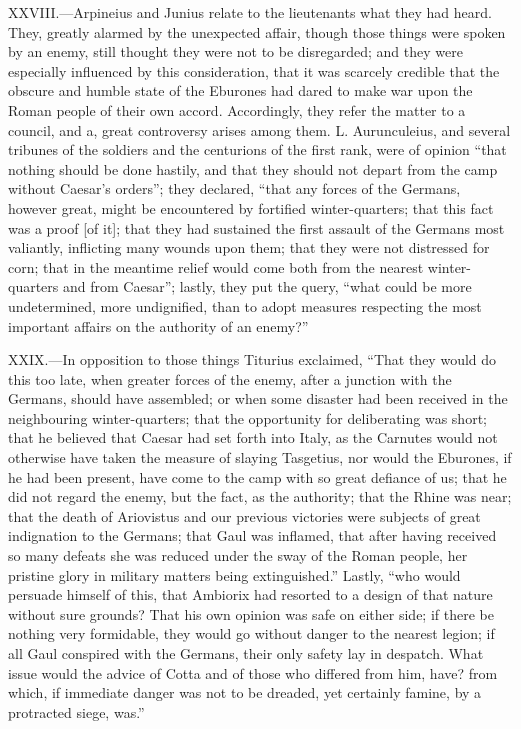 XXVIII.—Arpineius and Junius relate to the lieutenants what they had
heard. They, greatly alarmed by the unexpected affair, though those
things were spoken by an enemy, still thought they were not to be
disregarded; and they were especially influenced by this consideration,
that it was scarcely credible that the obscure and humble state of the
Eburones had dared to make war upon the Roman people of their own
accord. Accordingly, they refer the matter to a council, and a, great
controversy arises among them. L. Aurunculeius, and several tribunes of
the soldiers and the centurions of the first rank, were of opinion ``that
nothing should be done hastily, and that they should not depart from the
camp without Caesar's orders''; they declared, ``that any forces of the
Germans, however great, might be encountered by fortified winter-quarters;
that this fact was a proof [of it]; that they had sustained the first
assault of the Germans most valiantly, inflicting many wounds upon them;
that they were not distressed for corn; that in the meantime relief
would come both from the nearest winter-quarters and from Caesar''; lastly,
they put the query, ``what could be more undetermined, more undignified,
than to adopt measures respecting the most important affairs on the
authority of an enemy?''

XXIX.—In opposition to those things Titurius exclaimed, ``That they
would do this too late, when greater forces of the enemy, after a
junction with the Germans, should have assembled; or when some disaster
had been received in the neighbouring winter-quarters; that the
opportunity for deliberating was short; that he believed that Caesar had
set forth into Italy, as the Carnutes would not otherwise have taken the
measure of slaying Tasgetius, nor would the Eburones, if he had been
present, have come to the camp with so great defiance of us; that he did
not regard the enemy, but the fact, as the authority; that the Rhine was
near; that the death of Ariovistus and our previous victories were
subjects of great indignation to the Germans; that Gaul was inflamed,
that after having received so many defeats she was reduced under the
sway of the Roman people, her pristine glory in military matters being
extinguished.'' Lastly, ``who would persuade himself of this, that
Ambiorix had resorted to a design of that nature without sure grounds?
That his own opinion was safe on either side; if there be nothing very
formidable, they would go without danger to the nearest legion; if all
Gaul conspired with the Germans, their only safety lay in despatch. What
issue would the advice of Cotta and of those who differed from him,
have? from which, if immediate danger was not to be dreaded, yet
certainly famine, by a protracted siege, was.''

